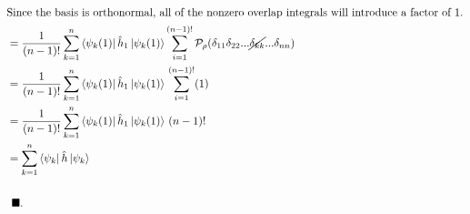\documentclass{article}
\newcommand{\vsp}{\vspace{0.2cm}}
\newcommand{\suml}{\sum\limits}
\newcommand{\no}{\cancel}
\renewcommand{\qed}{\ensuremath{\vsp \\ &\hspace{0.15cm} \blacksquare. \\}}
\newcommand{\pmt}{\ensuremath{\mathcal{P}}}
\newcommand{\dt}{\ensuremath{\delta}}   		 %
\newcommand{\y}{\ensuremath{\psi}}
\begin{document}
\begin{align*}
\intertext{Since the basis is orthonormal, all of the nonzero overlap integrals will introduce a factor of 1.}
&= 
   \frac{1}{(n-1)!} 
   \suml_ {k=1}^{n} 
   \Bra{\psi_k (1)} 
      \hat{h}_1 
   \Ket{\psi_k (1)} 
   \suml_{i=1}^{(n-1)!} \pmt_{\rho} (\dt_{11} \dt_{22} ... \no{\dt_{kk}} ... \dt_{nn} ) 
\\&= 
   \frac{1}{(n-1)!} 
   \suml_{k=1}^{n} 
   \Bra{\psi_k (1)} 
      \hat{h}_1 
   \Ket{\psi_k (1)} \, 
   \suml_{i=1}^{(n-1)!} (1)
\\&=					  
   \frac{1}{(n-1)!} 
   \suml_{k=1}^{n} 
   \Bra{\y_k (1)} 
      \hat{h}_1 
   \Ket{\y_k (1)} \, (n-1)! 
\\&= 
   \suml_{k=1}^{n} 
   \Bra{\y_k } 
      \hat{h} 
   \Ket{\y_k }  \\ \qed
\end{align*}

\newpage

\end{document}
